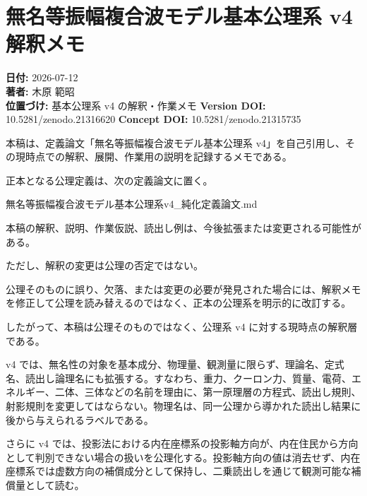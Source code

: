 \documentclass[
  a4paper,
]{ltjsarticle}
\author{}
\date{}
\newenvironment{Shaded}{}{}
\newcommand{\NormalTok}[1]{#1}
\begin{document}
\section{無名等振幅複合波モデル基本公理系 v4
解釈メモ}\label{ux7121ux540dux7b49ux632fux5e45ux8907ux5408ux6ce2ux30e2ux30c7ux30ebux57faux672cux516cux7406ux7cfb-v4-ux89e3ux91c8ux30e1ux30e2}

\textbf{日付:} 2026-07-12\\
\textbf{著者:} 木原 範昭\\
\textbf{位置づけ:} 基本公理系 v4 の解釈・作業メモ \textbf{Version DOI:}
10.5281/zenodo.21316620 \textbf{Concept DOI:} 10.5281/zenodo.21315735

本稿は、定義論文「無名等振幅複合波モデル基本公理系
v4」を自己引用し、その現時点での解釈、展開、作業用の説明を記録するメモである。

正本となる公理定義は、次の定義論文に置く。

\begin{Shaded}
\begin{Highlighting}[]
\NormalTok{無名等振幅複合波モデル基本公理系v4\_純化定義論文.md}
\end{Highlighting}
\end{Shaded}

本稿の解釈、説明、作業仮説、読出し例は、今後拡張または変更される可能性がある。

ただし、解釈の変更は公理の否定ではない。

公理そのものに誤り、欠落、または変更の必要が発見された場合には、解釈メモを修正して公理を読み替えるのではなく、正本の公理系を明示的に改訂する。

したがって、本稿は公理そのものではなく、公理系 v4
に対する現時点の解釈層である。

v4
では、無名性の対象を基本成分、物理量、観測量に限らず、理論名、定式名、読出し論理名にも拡張する。すなわち、重力、クーロン力、質量、電荷、エネルギー、二体、三体などの名前を理由に、第一原理層の方程式、読出し規則、射影規則を変更してはならない。物理名は、同一公理から導かれた読出し結果に後から与えられるラベルである。

さらに v4
では、投影法における内在座標系の投影軸方向が、内在住民から方向として判別できない場合の扱いを公理化する。投影軸方向の値は消去せず、内在座標系では虚数方向の補償成分として保持し、二乗読出しを通じて観測可能な補償量として読む。
\end{document}
